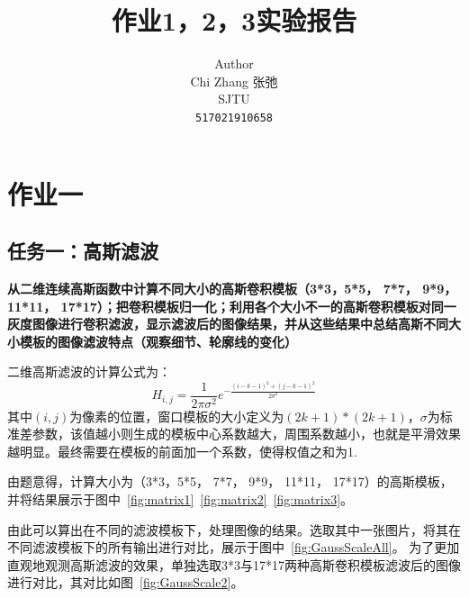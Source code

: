 \documentclass[10pt,twocolumn,letterpaper]{article}
\begin{document}
\title{作业1，2，3实验报告}

\author{Author\\
Chi Zhang 张弛\\
SJTU\\
{\tt\small 517021910658}
}

\maketitle


\section{作业一}


\subsection{\textbf{任务一：高斯滤波}}

\textbf{从二维连续高斯函数中计算不同大小的高斯卷积模板（3*3，5*5， 7*7， 9*9， 11*11， 17*17）；把卷积模板归一化；利用各个大小不一的高斯卷积模板对同一灰度图像进行卷积滤波，显示滤波后的图像结果，并从这些结果中总结高斯不同大小模板的图像滤波特点（观察细节、轮廓线的变化）}

二维高斯滤波的计算公式为：
\begin{equation}
   H_{i,j}=\frac{1}{2\pi\sigma^2}e^{-\frac{(i-k-1)^2+(j-k-1)^2}{2\sigma^2}}
\end{equation}
其中$(i,j)$为像素的位置，窗口模板的大小定义为$(2k+1)*(2k+1)$，$\sigma$为标准差参数，该值越小则生成的模板中心系数越大，周围系数越小，也就是平滑效果越明显。最终需要在模板的前面加一个系数，使得权值之和为1.

由题意得，计算大小为（3*3，5*5， 7*7， 9*9， 11*11， 17*17）的高斯模板，并将结果展示于图中~\ref{fig:matrix1}~\ref{fig:matrix2}~\ref{fig:matrix3}。

由此可以算出在不同的滤波模板下，处理图像的结果。选取其中一张图片，将其在不同滤波模板下的所有输出进行对比，展示于图中~\ref{fig:GaussScaleAll}。
为了更加直观地观测高斯滤波的效果，单独选取3*3与17*17两种高斯卷积模板滤波后的图像进行对比，其对比如图~\ref{fig:GaussScale2}。
\end{document}
